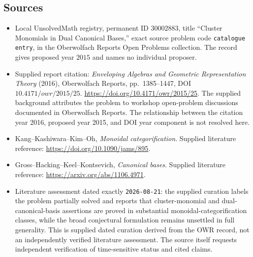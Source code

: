 \documentclass[11pt]{article}
\begin{document}
\subsection{Sources}
\begin{itemize}
\item Local UnsolvedMath registry, permanent ID \(30002883\), title ``Cluster Monomials in Dual Canonical Bases,'' exact source problem code \texttt{catalogue entry}, in the Oberwolfach Reports Open Problems collection. The record gives proposed year \(2015\) and names no individual proposer.
\item Supplied report citation: \emph{Enveloping Algebras and Geometric Representation Theory} (2016), Oberwolfach Reports, pp.~1385--1447, DOI \(10.4171/owr/2015/25\). \url{https://doi.org/10.4171/owr/2015/25}. The supplied background attributes the problem to workshop open-problem discussions documented in Oberwolfach Reports. The relationship between the citation year 2016, proposed year 2015, and DOI year component is not resolved here.
\item Kang--Kashiwara--Kim--Oh, \emph{Monoidal categorification}. Supplied literature reference: \url{https://doi.org/10.1090/jams/895}.
\item Gross--Hacking--Keel--Kontsevich, \emph{Canonical bases}. Supplied literature reference: \url{https://arxiv.org/abs/1106.4971}.
\item Literature assessment dated exactly \texttt{2026-08-21}: the supplied curation labels the problem partially solved and reports that cluster-monomial and dual-canonical-basis assertions are proved in substantial monoidal-categorification classes, while the broad conjectural formulation remains unsettled in full generality. This is supplied dated curation derived from the OWR record, not an independently verified literature assessment. The source itself requests independent verification of time-sensitive status and cited claims.
\end{itemize}
\end{document}
